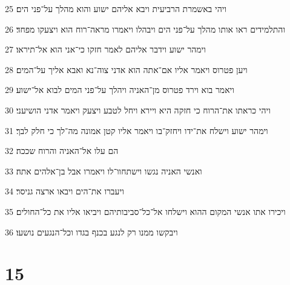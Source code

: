\par 25 ויהי באשמרת הרביעית ויבא אליהם ישוע והוא מהלך על־פני הים׃
\par 26 והתלמידים ראו אותו מהלך על־פני הים ויבהלו ויאמרו מראה־רוח הוא ויצעקו מפחד׃
\par 27 וימהר ישוע וידבר אליהם לאמר חזקו כי־אני הוא אל־תיראו׃
\par 28 ויען פטרוס ויאמר אליו אם־אתה הוא אדני צוה־נא ואבא אליך על־המים׃
\par 29 ויאמר בוא וירד פטרוס מן־האניה ויהלך על־פני המים לבוא אל־ישוע׃
\par 30 ויהי כראתו את־הרוח כי חזקה היא ויירא ויחל לטבע ויצעק ויאמר אדני הושיעני׃
\par 31 וימהר ישוע וישלח את־ידו ויחזק־בו ויאמר אליו קטן אמונה מה־לך כי חלק לבך׃
\par 32 הם עלו אל־האניה והרוח שככה׃
\par 33 ואנשי האניה נגשו וישתחוו־לו ויאמרו אבל בן־אלהים אתה׃
\par 34 ויעברו את־הים ויבאו ארצה גניסר׃
\par 35 ויכירו אתו אנשי המקום ההוא וישלחו אל־כל־סביבותיהם ויביאו אליו את כל־החולים׃
\par 36 ויבקשו ממנו רק לנגע בכנף בגדו וכל־הנגעים נושעו׃

\chapter{15}

